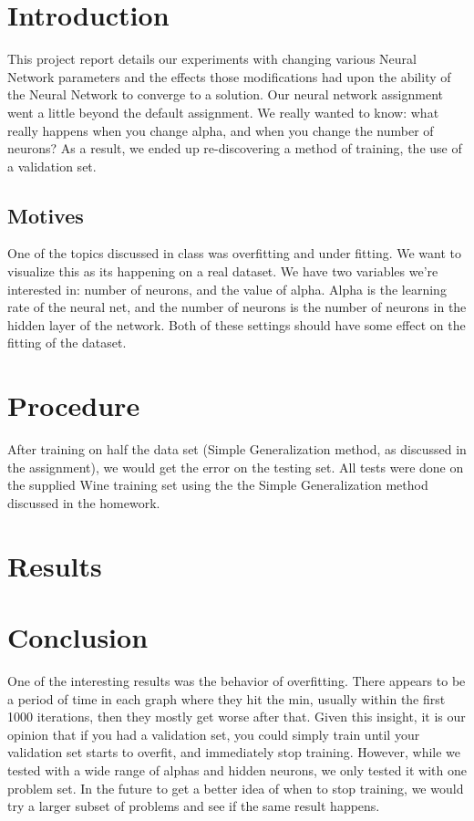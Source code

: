 \documentclass[11pt,letterpaper]{article}
\begin{document}
\maketitle

\section{Introduction}
This project report details our experiments with changing various Neural Network parameters and the effects those modifications had upon the ability of the Neural Network to converge to a solution. Our neural network assignment went a little beyond the default assignment. We really wanted to know: what really happens when you change alpha, and when you change the number of neurons? As a result, we ended up re-discovering a method of training, the use of a validation set.

\subsection{Motives} One of the topics discussed in class was overfitting and under fitting. We want to visualize this as its happening on a real dataset. We have two variables we're interested in: number of neurons, and the value of alpha. Alpha is the learning rate of the neural net, and the number of neurons is the number of neurons in the hidden layer of the network.  Both of these settings should have some effect on the fitting of the dataset.

\section{Procedure}
After training on half the data set (Simple Generalization method, as discussed in the assignment), we would get the error on the testing set. 
All tests were done on the supplied Wine training set using the the Simple Generalization method discussed in the homework. 

\section{Results}

\section{Conclusion}
One of the interesting results was the behavior of overfitting. There appears to be a period of time in each graph where they hit the min, usually within the first 1000 iterations, then they mostly get worse after that. Given this insight, it is our opinion that if you had a validation set, you could simply train until your validation set starts to overfit, and immediately stop training. However, while we tested with a wide range of alphas and hidden neurons, we only tested it with one problem set. In the future to get a better idea of when to stop training, we would try a larger subset of problems and see if the same result happens.



\end{document}
